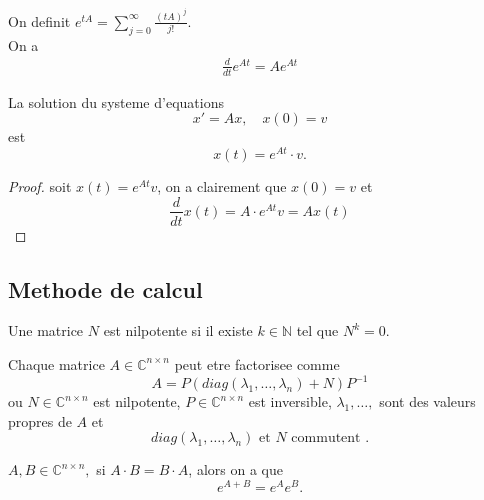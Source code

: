 \documentclass[../main.tex]{subfiles}
\begin{document}
On definit $ e^{tA} = \sum_{j=0}^{ \infty } \frac{( tA) ^{j}}{j!} $.\\
On a 
\begin{align*}
\frac{d}{dt} e^{At} = A e^{A t} 
\end{align*}
\begin{thm}
La solution du systeme d'equations 
\[ 
	x' = Ax, \quad x( 0) =v
\]
est 
\[ 
	x( t) = e^{At} \cdot v.
\]

\end{thm}
\begin{proof}
	soit $x( t) = e^{At} v$, on a clairement que $x( 0) = v$ et
	\[ 
		\frac{d}{dt}x( t) = A \cdot e^{At} v = Ax( t) 	
	\]
	
\end{proof}
\subsection*{Methode de calcul}
\begin{defn}
	Une matrice $N$ est nilpotente si il existe $k \in \mathbb{N}$ tel que $N^{k}=0$.\\
\end{defn}
\begin{thm}
Chaque matrice $A \in \mathbb{C}^{n\times n}$ peut etre factorisee comme 
\[ 
	A= P ( diag( \lambda_1,\ldots, \lambda_n)+N ) P^{-1}
\]
ou $N \in \mathbb{C}^{n\times n}$ est nilpotente, $P \in \mathbb{C}^{n\times n}$ est inversible, $\lambda_1, \ldots,$ sont des valeurs propres de $A$ et
\[ 
	diag( \lambda_1,\ldots,\lambda_n)  \text{ et $N$ commutent } .
\]


\end{thm}
\begin{lemma}
$A,B \in \mathbb{C}^{n\times n}, $ si $A \cdot B= B \cdot A$, alors on a que 
\[ 
e^{A+B} = e^{A} e^{B} .
\]

\end{lemma}
\end{document}

